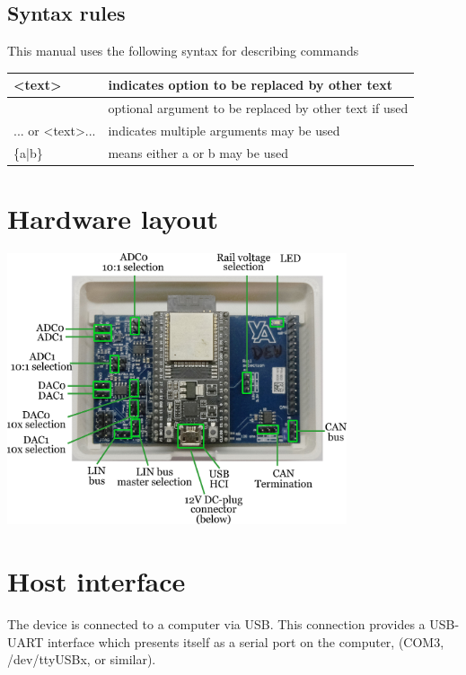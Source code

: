 \documentclass{article}[a4paper]
\begin{document}
\subsection{Syntax rules}
This manual uses the following syntax for describing commands

\medskip
\noindent
\begin{tabularx}{\textwidth}{|p{4cm}|X|}
\hline
<text> & indicates option to be replaced by other text \\
\hline
[text] & optional argument to be replaced by other text if used\\
\hline
[text]... or <text>... & indicates multiple arguments may be used \\
\hline
\{a|b\} & means either a or b may be used \\
\hline
\end{tabularx}

\section{Hardware layout}

\begin{center}
\includegraphics[width=10cm]{lab-pcb-connections.png}
\end{center}

\section{Host interface}

The device is connected to a computer via USB. This connection provides a
USB-UART interface which presents itself as a serial port on the computer,
(COM3, /dev/ttyUSBx, or similar).
\end{document}
